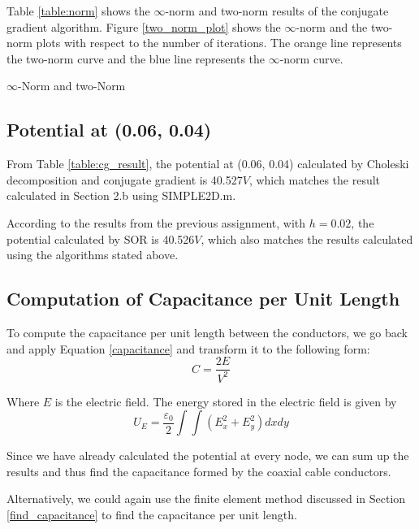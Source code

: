 \documentclass[a4paper,titlepage]{article}
\begin{document}
				Table \ref{table:norm} shows the $\infty$-norm and two-norm results of the conjugate gradient algorithm. Figure \ref{two_norm_plot} shows the $\infty$-norm and the two-norm plots with respect to the number of iterations. The orange line represents the two-norm curve and the blue line represents the $\infty$-norm curve. 
				\begin{table}[!htb]
					\centering
					\caption{$\infty$-Norm and two-Norm}
					\label{table:norm}
				\end{table}
			\subsection{Potential at (0.06, 0.04)}
				From Table \ref{table:cg_result}, the potential at (0.06, 0.04) calculated by Choleski decomposition and conjugate gradient is 40.527$V$, which matches the result calculated in Section 2.b using SIMPLE2D.m.
				
				According to the results from the previous assignment, with $h = 0.02$, the potential calculated by SOR is 40.526$V$, which also matches the results calculated using the algorithms stated above. 
			\subsection{Computation of Capacitance per Unit Length}
				To compute the capacitance per unit length between the conductors, we go back and apply Equation \ref{capacitance} and transform it to the following form:
				$$
					C = \frac{2E}{V^2}
				$$
				
				Where $E$ is the electric field. The energy stored in the electric field is given by
				\begin{equation}
					U_E = \frac{\varepsilon_0}{2}\int \int (E_x^2 + E_y^2)dxdy
				\end{equation}
				
				Since we have already calculated the potential at every node, we can sum up the results and thus find the capacitance formed by the coaxial cable conductors.
				
				Alternatively, we could again use the finite element method discussed in Section \ref{find_capacitance} to find the capacitance per unit length.
				
\end{document}
